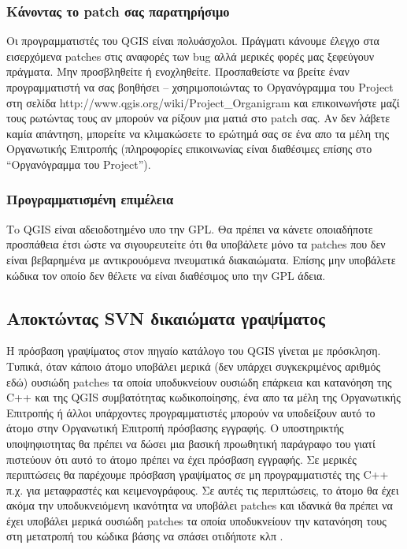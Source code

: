 \subsubsection{Κάνοντας το patch σας παρατηρήσιμο}
Οι προγραμματιστές του QGIS είναι πολυάσχολοι. Πράγματι κάνουμε έλεγχο στα εισερχόμενα patches στις αναφορές των bug αλλά μερικές φορές μας ξεφεύγουν πράγματα. Μην προσβληθείτε ή ενοχληθείτε. Προσπαθείστε να βρείτε έναν προγραμματιστή να σας βοηθήσει – χσηριμοποιώντας το Οργανόγραμμα του Project στη σελίδα http://www.qgis.org/wiki/Project_Organigram και επικοινωνήστε μαζί τους ρωτώντας τους αν μπορούν να ρίξουν μια ματιά στο patch σας. Αν δεν λάβετε καμία απάντηση, μπορείτε να κλιμακώσετε το ερώτημά σας σε ένα απο τα μέλη της Οργανωτικής Επιτροπής (πληροφορίες επικοινωνίας είναι διαθέσιμες επίσης στο “Οργανόγραμμα του Project”). 

\hypertarget{toc44}{}
\subsubsection{Προγραμματισμένη επιμέλεια}
Τo QGIS είναι αδειοδοτημένο υπο την GPL. Θα πρέπει να κάνετε οποιαδήποτε προσπάθεια έτσι ώστε να σιγουρευτείτε ότι θα υποβάλετε μόνο τα patches που δεν είναι βεβαρημένα με αντικρουόμενα πνευματικά διακαιώματα. Επίσης μην υποβάλετε κώδικα τον οποίο δεν θέλετε να είναι διαθέσιμος υπο την GPL άδεια.

\hypertarget{toc45}{}
\subsection{Αποκτώντας SVN δικαιώματα γραψίματος}
Η πρόσβαση γραψίματος στον πηγαίο κατάλογο του QGIS γίνεται με πρόσκληση. Τυπικά, όταν κάποιο άτομο υποβάλει μερικά (δεν υπάρχει συγκεκριμένος αριθμός εδώ) ουσιώδη patches τα οποία υποδυκνείουν ουσιώδη επάρκεια και κατανόηση της C++ και της QGIS συμβατότητας κωδικοποίησης, ένα απο τα μέλη της Οργανωτικής Επιτροπής ή άλλοι υπάρχοντες προγραμματιστές μπορούν να υποδείξουν αυτό το άτομο στην Οργανωτική Επιτροπή πρόσβασης εγγραφής. Ο υποστηρικτής υποψηφιοτητας θα πρέπει να δώσει μια βασική προωθητική παράγραφο του γιατί πιστεύουν ότι αυτό το άτομο πρέπει να έχει πρόσβαση εγγραφής. Σε μερικές περιπτώσεις θα παρέχουμε πρόσβαση γραψίματος σε μη προγραμματιστές της C++ π.χ. για μεταφραστές και κειμενογράφους. Σε αυτές τις περιπτώσεις, το άτομο θα έχει ακόμα την υποδυκνειόμενη ικανότητα να υποβάλει patches και ιδανικά θα πρέπει να έχει υποβάλει μερικά ουσιώδη patches τα οποία υποδυκνείουν την κατανόηση τους στη μετατροπή του κώδικα βάσης να σπάσει οτιδήποτε κλπ .

